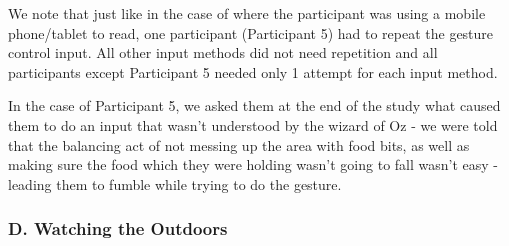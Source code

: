 \documentclass{sigchi}
\begin{document}
\begin{table}[H] %
\centering
\caption{Number of attempts by each participant for each input method, when eating finger food when a request to intervene was issued}
\label{table:attemptsFingerfood}
\end{table}

We note that just like in the case of where the participant was using a mobile phone/tablet to read, one participant (Participant 5) had to repeat the gesture control input. All other input methods did not need repetition and all participants except Participant 5 needed only 1 attempt for each input method.

In the case of Participant 5, we asked them at the end of the study what caused them to do an input that wasn't understood by the wizard of Oz - we were told that the balancing act of not messing up the area with food bits, as well as making sure the food which they were holding wasn't going to fall wasn't easy - leading them to fumble while trying to do the gesture.
\subsubsection{D. Watching the Outdoors}
\end{document}
